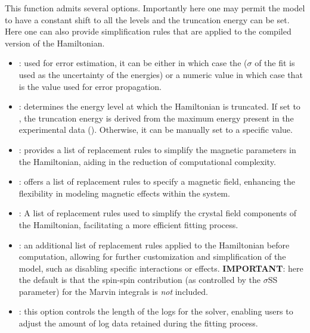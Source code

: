 \documentclass[11pt, twoside,openright]{article}
\begin{document}
This function admits several options. Importantly here one may permit the model to have a constant shift to all the levels and the truncation energy can be set. Here one can also provide simplification rules that are applied to the compiled version of the Hamiltonian.

\begin{itemize}

	\item {}: used for error estimation, it can be either  in which case the ($\sigma$ of the fit is used as the uncertainty of the energies) or a numeric value in which case that is the value used for error propagation.

	\item {}: determines the energy level at which the Hamiltonian is truncated. If set to , the truncation energy is derived from the maximum energy present in the experimental data (). Otherwise, it can be manually set to a specific value.
	
	\item {}: provides a list of replacement rules to simplify the magnetic parameters in the Hamiltonian, aiding in the reduction of computational complexity.
	
	\item {}: offers a list of replacement rules to specify a magnetic field, enhancing the flexibility in modeling magnetic effects within the system.
	
	\item {}: A list of replacement rules used to simplify the crystal field components of the Hamiltonian, facilitating a more efficient fitting process.
	
	\item {}: an additional list of replacement rules applied to the Hamiltonian before computation, allowing for further customization and simplification of the model, such as disabling specific interactions or effects. \textbf{IMPORTANT}: here the default is that the spin-spin contribution (as controlled by the $\sigma$SS parameter) for the Marvin integrals is \textit{not} included.
	
	\item {}: this option controls the length of the logs for the solver, enabling users to adjust the amount of log data retained during the fitting process.
	

\end{itemize}
\end{document}
